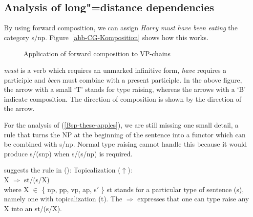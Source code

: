 \subsection{Analysis of long"=distance dependencies}
\label{Abschnitt-CG-UDC}

By using forward composition, we can assign \emph{Harry must have been eating} the category
s/np. Figure~\vref{abb-CG-Komposition} shows how this works.
\begin{figure}
\centerline{%
}
\caption{\label{abb-CG-Komposition}Application of forward composition to VP-chains}
\end{figure}%
\emph{must} is a verb which requires an unmarked infinitive form,  \emph{have} requires a participle and \emph{been} must combine with a
present participle. In the above figure, the arrow with a small `T' stands for type raising, whereas the arrows with a `B' indicate composition.
The direction of composition is shown by the direction of the arrow.

For the analysis of (\ref{Bsp-these-apples}), we are still missing one small detail, a rule that turns the NP at the beginning of the sentence
into a functor which can be combined with s/np. Normal type raising cannot handle this because it would produce s/(s\bs np) when s/(s/np)
is required.

\citet[]{Steedman89a} suggests the rule in ():
\ea
\label{Regel-Topikalisierung}
Topicalization ($\uparrow$\is{$\uparrow$}):\\
X $\Rightarrow$ st/(s/X)\\
where X $\in$ \{ np, pp, vp, ap, s$'$ \}
\z
st stands for a particular type of sentence (s), namely one with topicalization (t). The
$\Rightarrow$ expresses that one can type raise any X into an st/(s/X). 

